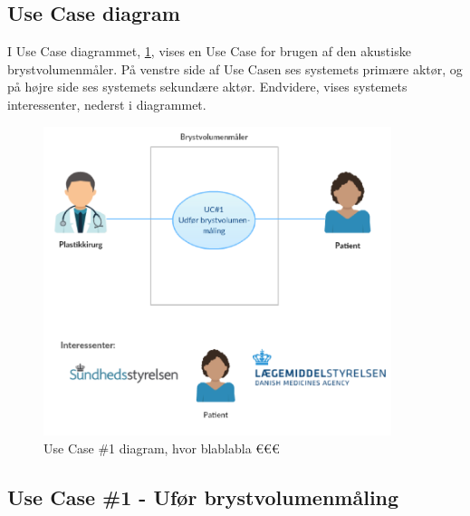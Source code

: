	\pagebreak
	
		\subsection{Use Case diagram}
		I Use Case diagrammet, \ref{fig:UC1}, vises en Use Case for brugen af den akustiske brystvolumenmåler. På venstre side af Use Casen ses systemets primære aktør, og på højre side ses systemets sekundære aktør. Endvidere, vises systemets interessenter, nederst i diagrammet.  
	
			\begin{figure}[htb]
				\centering
					\includegraphics[width=4in]{UC1.png}
					\caption{Use Case \#1 diagram, hvor blablabla €€€}
					\label{fig:UC1}
			\end{figure}	 
	\pagebreak	
	\newpage	
  
  		\subsection{Use Case \#1 - Ufør brystvolumenmåling}
  			

